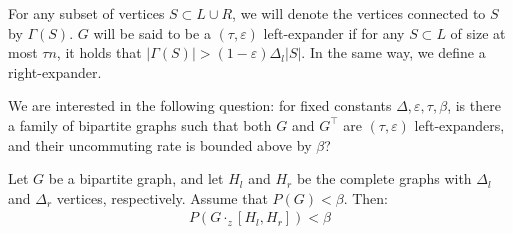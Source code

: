 \documentclass[manuscript,screen,review]{acmart}
\begin{document}
For any subset of vertices $S \subset L \cup R$, we will denote the vertices connected to $S$ by $\Gamma(S)$. $G$ will be said to be a $(\tau, \varepsilon)$ left-expander if for any $S \subset L$ of size at most $\tau n$, it holds that $|\Gamma(S)| > (1-\varepsilon)\Delta_{l}|S|$. In the same way, we define a right-expander.

We are interested in the following question: for fixed constants $\Delta, \varepsilon, \tau, \beta$, is there a family of bipartite graphs such that both $G$ and $G^{\top}$ are $(\tau,\varepsilon)$ left-expanders, and their uncommuting rate is bounded above by $\beta$?


\begin{claim}  
Let $G$ be a bipartite graph, and let $H_{l}$ and $H_{r}$ be the complete graphs with $\Delta_{l}$ and $\Delta_{r}$ vertices, respectively. Assume that $P(G) < \beta$. Then:
\begin{equation*}
  \begin{split}
      P(G \cdot_{z} [H_{l},H_{r}]) < \beta
  \end{split}
\end{equation*}
\end{claim}
\end{document}
